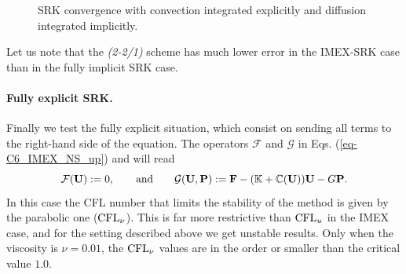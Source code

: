 \begin{figure}[h!]
  \caption{SRK convergence with convection integrated explicitly and diffusion integrated implicitly.}
  \label{fig:IMEX_explcnv_RK_analytical}
\end{figure}
Let us note that the \textit{(2-2/1)} scheme has much lower error in the IMEX-SRK case than in the fully implicit SRK case.

\paragraph{Fully explicit SRK.}

Finally we test the fully explicit situation, which consist on sending all terms to the right-hand side of the equation. The operators $\mathcal{F}$ and $\mathcal{G}$ in  Eqs. (\ref{eq-C6_IMEX_NS_up}) and  will read
$$\mathcal{F}({\bf U}):=0,\quad\quad\mbox{and}\quad\quad\mathcal{G}({\bf U},{\bf P}):={\bf F}-(\mathbb{K}+\mathbb{C}({\bf U})){\bf U}-G{\bf P}.$$
In this case the {CFL} number that limits the stability of the method is given by the parabolic one (${\rm CFL}_\nu$). This is far more restrictive than ${\rm CFL}_u$ in the IMEX case, and for the setting described above we get unstable results. Only when the viscosity is $\nu=0.01$, the ${\rm CFL}_\nu$ values are in the order or smaller than the critical value $1.0$.

